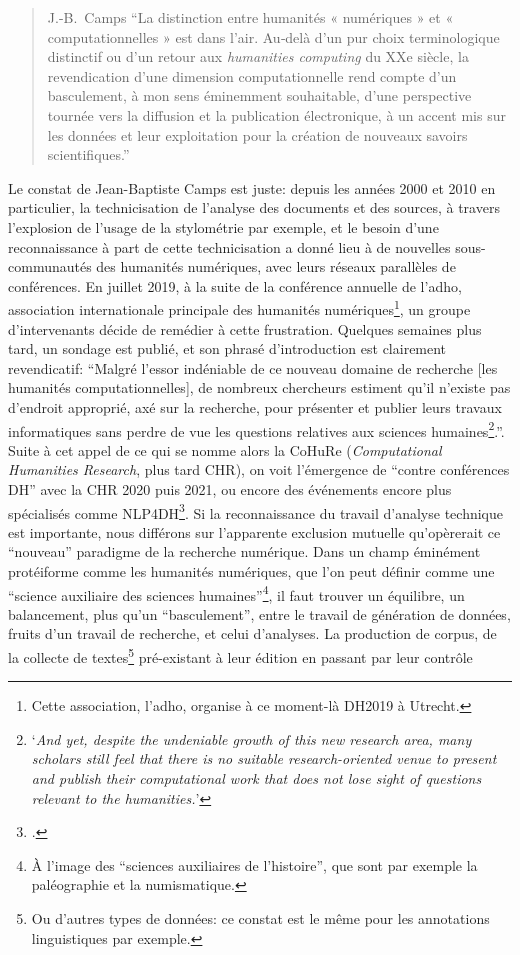\begin{quote}{J.-B.~Camps}
\enquote{La distinction entre humanités « numériques » et « computationnelles » est dans l’air. Au‑delà d’un pur choix terminologique distinctif ou d’un retour aux \textit{humanities computing} du XXe siècle, la revendication d’une dimension computationnelle rend compte d’un basculement, à mon sens éminemment souhaitable, d’une perspective tournée vers la diffusion et la publication électronique, à un accent mis sur les données et leur exploitation pour la création de nouveaux savoirs scientifiques.}\footnotemark
\end{quote}

Le constat de Jean-Baptiste Camps est juste: depuis les années 2000 et 2010 en particulier, la technicisation de l'analyse des documents et des sources, à travers l'explosion de l'usage de la stylométrie par exemple, et le besoin d'une reconnaissance à part de cette technicisation a donné lieu à de nouvelles sous-communautés des humanités numériques, avec leurs réseaux parallèles de conférences. En juillet 2019, à la suite de la conférence annuelle de l'\acrfull{adho}, association internationale principale des humanités numériques\footnote{Cette association, l'\acrshort{adho}, organise à ce moment-là DH2019 à Utrecht.}, un groupe d'intervenants décide de remédier à cette frustration. Quelques semaines plus tard, un sondage est publié, et son phrasé d'introduction est clairement revendicatif: \enquote{Malgré l'essor indéniable de ce nouveau domaine de recherche [les humanités computationnelles], de nombreux chercheurs estiment qu'il n'existe pas d'endroit approprié, axé sur la recherche, pour présenter et publier leurs travaux informatiques sans perdre de vue les questions relatives aux sciences humaines\footnote{\enquote{\textit{And yet, despite the undeniable growth of this new research area, many scholars still feel that there is no suitable research-oriented venue to present and publish their computational work that does not lose sight of questions relevant to the humanities.}}\textcite{noauthor_computational_nodate}}.}. Suite à cet appel de ce qui se nomme alors la CoHuRe (\textit{Computational Humanities Research}, plus tard CHR), on voit l'émergence de \enquote{contre conférences DH} avec la CHR 2020 puis 2021, ou encore des événements encore plus spécialisés comme NLP4DH\footcite{noauthor_workshop_nodate}. Si la reconnaissance du travail d'analyse technique est importante, nous différons sur l'apparente exclusion mutuelle qu'opèrerait ce \enquote{nouveau} paradigme de la recherche numérique. Dans un champ éminément protéiforme comme les humanités numériques, que l'on peut définir comme une \enquote{science auxiliaire des sciences humaines}\footnote{À l'image des \enquote{sciences auxiliaires de l'histoire}, que sont par exemple la paléographie et la numismatique.}, il faut trouver un équilibre, un balancement, plus qu'un \enquote{basculement}, entre le travail de génération de données, fruits d'un travail de recherche, et celui d'analyses. La production de corpus, de la collecte de textes\footnote{Ou d'autres types de données: ce constat est le même pour les annotations linguistiques par exemple.} pré-existant à leur édition en passant par leur contrôle 